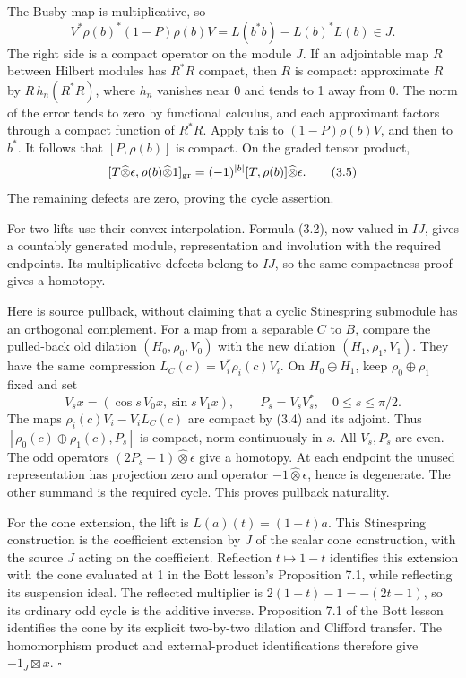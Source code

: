 \documentclass[
  11pt,
]{article}
\begin{document}
The Busby map is multiplicative, so \[
V^*\rho(b)^*(1-P)\rho(b)V
=L(b^*b)-L(b)^*L(b)\in J.
\tag{3.4}
\] The right side is a compact operator on the module \(J\). If an
adjointable map \(R\) between Hilbert modules has \(R^*R\) compact, then
\(R\) is compact: approximate \(R\) by \(R\,h_n(R^*R)\), where \(h_n\)
vanishes near 0 and tends to 1 away from 0. The norm of the error tends
to zero by functional calculus, and each approximant factors through a
compact function of \(R^*R\). Apply this to \((1-P)\rho(b)V\), and then
to \(b^*\). It follows that \([P,\rho(b)]\) is compact. On the graded
tensor product, \[
[T\widehat\otimes\epsilon,\rho(b)\widehat\otimes1]_{\rm gr}
=(-1)^{|b|}[T,\rho(b)]\widehat\otimes\epsilon.
\tag{3.5}
\] The remaining defects are zero, proving the cycle assertion.

For two lifts use their convex interpolation. Formula (3.2), now valued
in \(IJ\), gives a countably generated module, representation and
involution with the required endpoints. Its multiplicative defects
belong to \(IJ\), so the same compactness proof gives a homotopy.

Here is source pullback, without claiming that a cyclic Stinespring
submodule has an orthogonal complement. For a map from a separable \(C\)
to \(B\), compare the pulled-back old dilation \((H_0,\rho_0,V_0)\) with
the new dilation \((H_1,\rho_1,V_1)\). They have the same compression
\(L_C(c)=V_i^*\rho_i(c)V_i\). On \(H_0\oplus H_1\), keep
\(\rho_0\oplus\rho_1\) fixed and set \[
V_sx=(\cos s\,V_0x,\sin s\,V_1x),\qquad
P_s=V_sV_s^*,\quad 0\le s\le\pi/2.
\tag{3.6}
\] The maps \(\rho_i(c)V_i-V_iL_C(c)\) are compact by (3.4) and its
adjoint. Thus \([\rho_0(c)\oplus\rho_1(c),P_s]\) is compact,
norm-continuously in \(s\). All \(V_s,P_s\) are even. The odd operators
\((2P_s-1)\widehat\otimes\epsilon\) give a homotopy. At each endpoint
the unused representation has projection zero and operator
\(-1\widehat\otimes\epsilon\), hence is degenerate. The other summand is
the required cycle. This proves pullback naturality.

For the cone extension, the lift is \(L(a)(t)=(1-t)a\). This Stinespring
construction is the coefficient extension by \(J\) of the scalar cone
construction, with the source \(J\) acting on the coefficient.
Reflection \(t\mapsto1-t\) identifies this extension with the cone
evaluated at 1 in the Bott lesson's Proposition 7.1, while reflecting
its suspension ideal. The reflected multiplier is \(2(1-t)-1=-(2t-1)\),
so its ordinary odd cycle is the additive inverse. Proposition 7.1 of
the Bott lesson identifies the cone by its explicit two-by-two dilation
and Clifford transfer. The homomorphism product and external-product
identifications therefore give \(-1_J\boxtimes x\). \(\square\)
\end{document}
